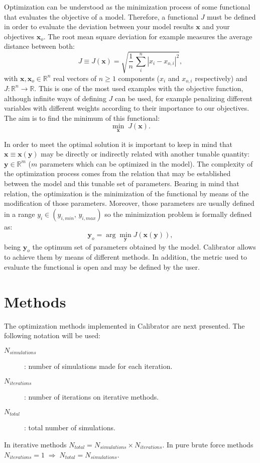 \documentclass[review,authoryear]{elsarticle}
\newcommand{\EQ}[2]
{\begin{equation}#1\label{#2}\end{equation}}
\newcommand{\ABS}[1]{\left|#1\right|}
\newcommand{\PA}[1]{\left(#1\right)}
\begin{document}
Optimization can be understood as the minimization process of some functional
that evaluates the objective of a model. Therefore, a functional $J$ must be
defined in order to evaluate the deviation between your model results
$\mathbf{x}$ and your objectives $\mathbf{x}_o$. The root mean square deviation
for example measures the average distance between both:
\EQ
{
	J \equiv J\PA{\mathbf{x}}
	=\sqrt{\frac{1}{n}\,\sum_i^n\ABS{x_i-x_{o,i}}^2},
}{EqRMSD}
with $\mathbf{x},\mathbf{x}_o\in\mathbb{R}^n$ real vectors of $n\ge 1$
components ($x_i$ and $x_{o,i}$ respectively) and
$J:\mathbb{R}^n \rightarrow \mathbb{R}$. 
This is one of the most used examples with the objective function, although 
infinite ways of defining $J$ can be used, for example penalizing different
variables with different weights according to their importance to our
objectives. The aim is to find the minimum of this functional:
\EQ{\min_{\mathbf{x}}\;J\PA{\mathbf{x}}.}{EqFunctionalMin}

In order to meet the optimal solution it is important to keep in mind that
$\mathbf{x}\equiv\mathbf{x}\PA{\mathbf{y}}$ may be directly or indirectly
related with another tunable quantity: $\mathbf{y}\in\mathbb{R}^m$  ($m$
parameters which can be optimized in the model). The complexity of the
optimization process comes from the relation that may be established between the
model and this tunable set of parameters. Bearing in mind that relation, the
optimization is the minimization of the functional by means of the modification
of those parameters. Moreover, those parameters are usually defined in a range
$y_i\in\PA{y_{i,min},\,y_{i,max}}$ so the minimization problem is formally
defined as:
\EQ
{
	\mathbf{y}_o=\arg\min_{\mathbf{y}}J\PA{\mathbf{x}\PA{\mathbf{y}}},
}{EqParametersOptimal}
being $\mathbf{y}_o$ the optimum set of parameters obtained by the model.
Calibrator allows to achieve them by means of different methods. In addition,
the metric used to evaluate the functional is open and may be defined by the
user.

\section{Methods}

The optimization methods implemented in Calibrator are next presented. The following notation will be used:
\begin{description}
	\item[$N_{simulations}$]: number of simulations made for each iteration.
	\item[$N_{iterations}$]: number of iterations on iterative methods.
	\item[$N_{total}$]: total number of simulations.
\end{description}
In iterative methods $N_{total}=N_{simulations}\times N_{iterations}$.
In pure brute force methods
$N_{iterations}=1\;\Rightarrow\;N_{total}=N_{simulations}$.
\end{document}
